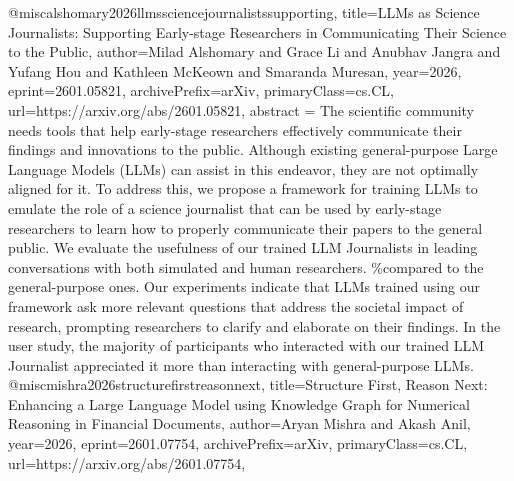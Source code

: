 {}@misc{alshomary2026llmssciencejournalistssupporting,
      title={LLMs as Science Journalists: Supporting Early-stage Researchers in Communicating Their Science to the Public}, 
      author={Milad Alshomary and Grace Li and Anubhav Jangra and Yufang Hou and Kathleen McKeown and Smaranda Muresan},
      year={2026},
      eprint={2601.05821},
      archivePrefix={arXiv},
      primaryClass={cs.CL},
      url={https://arxiv.org/abs/2601.05821},
      abstract = {The scientific community needs tools that help early-stage researchers effectively communicate their findings and innovations to the public. Although existing general-purpose Large Language Models (LLMs) can assist in this endeavor, they are not optimally aligned for it. To address this, we propose a framework for training LLMs to emulate the role of a science journalist that can be used by early-stage researchers to learn how to properly communicate their papers to the general public. We evaluate the usefulness of our trained LLM Journalists in leading conversations with both simulated and human researchers. \%compared to the general-purpose ones. Our experiments indicate that LLMs trained using our framework ask more relevant questions that address the societal impact of research, prompting researchers to clarify and elaborate on their findings. In the user study, the majority of participants who interacted with our trained LLM Journalist appreciated it more than interacting with general-purpose LLMs.}
}@misc{mishra2026structurefirstreasonnext,
      title={Structure First, Reason Next: Enhancing a Large Language Model using Knowledge Graph for Numerical Reasoning in Financial Documents}, 
      author={Aryan Mishra and Akash Anil},
      year={2026},
      eprint={2601.07754},
      archivePrefix={arXiv},
      primaryClass={cs.CL},
      url={https://arxiv.org/abs/2601.07754},
}
